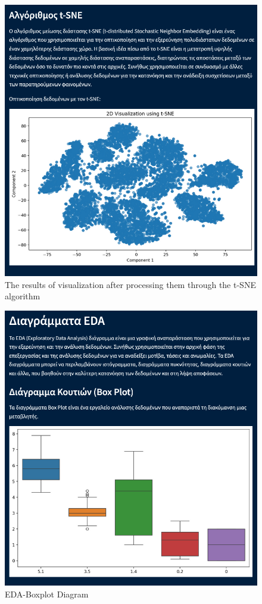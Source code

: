 \documentclass[unnumsec,webpdf,contemporary,large]{oup-authoring-template}%
\theoremstyle{thmstyleone}%
\theoremstyle{thmstyletwo}%
\theoremstyle{thmstylethree}%
\begin{document}
\begin{figure}
    \centering
    \includegraphics[width=1\linewidth]{images/t-sne.png}
    \caption{The results of visualization after processing them through the t-SNE algorithm}
    \label{fig:t-sne}
\end{figure}

\begin{figure}
    \centering
    \includegraphics[width=1\linewidth]{images/eda-boxplot.png}
    \caption{EDA-Boxplot Diagram}
    \label{fig:eda-boxplot}
\end{figure}
\end{document}
